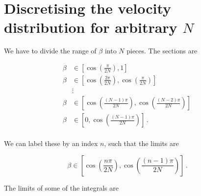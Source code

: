 \chapter{Discretising the velocity distribution for arbitrary $N$}


We have to divide the range of $\beta$ into $N$ pieces. The sections are

\begin{align*}
\beta &\in \left[\cos\left(\frac{\pi}{2N}\right), 1\right]\,\\
\beta &\in \left[\cos\left(\frac{2\pi}{2N}\right), \cos\left(\frac{\pi}{2N}\right)\right]\,\\
& \vdots\\
\beta &\in \left[\cos\left(\frac{(N-1)\pi}{2N}\right), \cos\left(\frac{(N-2)\pi}{2N}\right)\right]\,\\
\beta &\in \left[0, \cos\left(\frac{(N-1)\pi}{2N}\right)\right]\,.\\
\end{align*}

We can label these by an index $n$, such that the limits are

\begin{equation}
\beta \in \left[\cos\left(\frac{n\pi}{2N}\right), \cos\left(\frac{(n-1)\pi}{2N}\right)\right]\,.
\end{equation}

\begin{comment}
\begin{align*}
\beta &\in \left[\cos\left(\frac{\pi}{N}\right), 1\right]\,\\
\beta &\in \left[\cos\left(\frac{2\pi}{N}\right), \cos\left(\frac{\pi}{N}\right)\right]\,\\
& \vdots\\
\beta &\in \left[\cos\left(\frac{(N-1)\pi}{N}\right), \cos\left(\frac{(N-2)\pi}{N}\right)\right]\,\\
\beta &\in \left[0, \cos\left(\frac{(N-1)\pi}{N}\right)\right]\,.\\
\end{align*}

We can label these by an index $n$, such that the limits are

\begin{align*}
\beta &\in \left[\cos\left(\frac{n\pi}{N}\right), \cos\left(\frac{(n-1)\pi}{N}\right)\right] \qquad \textrm{ for } n < l\,,\\
\beta &\in \left[0, \cos\left(\frac{l\pi}{N}\right)\right] \qquad \textrm{ for } n = l\,.
\end{align*}
\end{comment}
The limits of some of the integrals are

